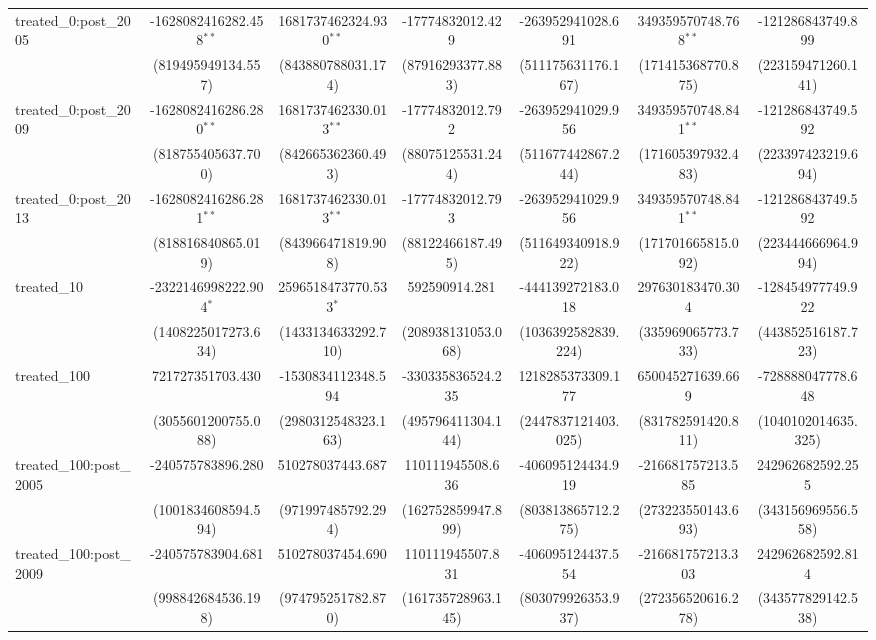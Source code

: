 \begin{table}[!htbp]
\begin{tabular}{@{\extracolsep{5pt}}lcccccc}
 treated_0:post_2005 & -1628082416282.458$^{**}$ & 1681737462324.930$^{**}$ & -17774832012.429$^{}$ & -263952941028.691$^{}$ & 349359570748.768$^{**}$ & -121286843749.899$^{}$ \\
  & (819495949134.557) & (843880788031.174) & (87916293377.883) & (511175631176.167) & (171415368770.875) & (223159471260.141) \\
 treated_0:post_2009 & -1628082416286.280$^{**}$ & 1681737462330.013$^{**}$ & -17774832012.792$^{}$ & -263952941029.956$^{}$ & 349359570748.841$^{**}$ & -121286843749.592$^{}$ \\
  & (818755405637.700) & (842665362360.493) & (88075125531.244) & (511677442867.244) & (171605397932.483) & (223397423219.694) \\
 treated_0:post_2013 & -1628082416286.281$^{**}$ & 1681737462330.013$^{**}$ & -17774832012.793$^{}$ & -263952941029.956$^{}$ & 349359570748.841$^{**}$ & -121286843749.592$^{}$ \\
  & (818816840865.019) & (843966471819.908) & (88122466187.495) & (511649340918.922) & (171701665815.092) & (223444666964.994) \\
 treated_10 & -2322146998222.904$^{*}$ & 2596518473770.533$^{*}$ & 592590914.281$^{}$ & -444139272183.018$^{}$ & 297630183470.304$^{}$ & -128454977749.922$^{}$ \\
  & (1408225017273.634) & (1433134633292.710) & (208938131053.068) & (1036392582839.224) & (335969065773.733) & (443852516187.723) \\
 treated_100 & 721727351703.430$^{}$ & -1530834112348.594$^{}$ & -330335836524.235$^{}$ & 1218285373309.177$^{}$ & 650045271639.669$^{}$ & -728888047778.648$^{}$ \\
  & (3055601200755.088) & (2980312548323.163) & (495796411304.144) & (2447837121403.025) & (831782591420.811) & (1040102014635.325) \\
 treated_100:post_2005 & -240575783896.280$^{}$ & 510278037443.687$^{}$ & 110111945508.636$^{}$ & -406095124434.919$^{}$ & -216681757213.585$^{}$ & 242962682592.255$^{}$ \\
  & (1001834608594.594) & (971997485792.294) & (162752859947.899) & (803813865712.275) & (273223550143.693) & (343156969556.558) \\
 treated_100:post_2009 & -240575783904.681$^{}$ & 510278037454.690$^{}$ & 110111945507.831$^{}$ & -406095124437.554$^{}$ & -216681757213.303$^{}$ & 242962682592.814$^{}$ \\
  & (998842684536.198) & (974795251782.870) & (161735728963.145) & (803079926353.937) & (272356520616.278) & (343577829142.538) \\

\end{tabular}
\end{table}
